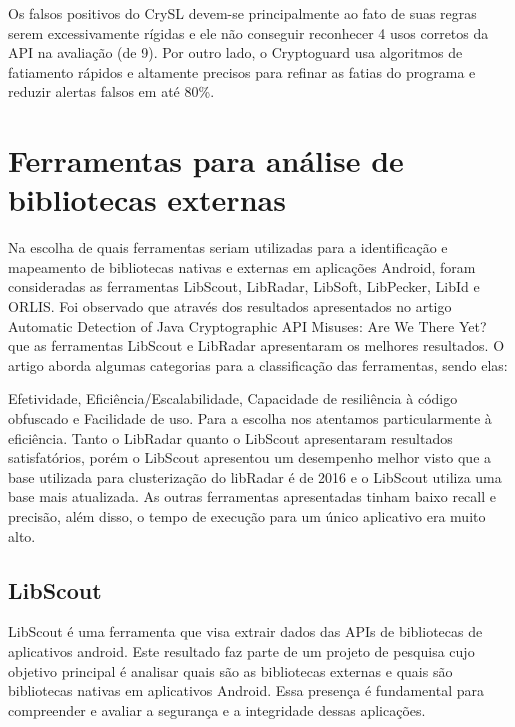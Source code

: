 Os falsos positivos do CrySL devem-se principalmente ao fato de suas regras serem excessivamente rígidas e ele não conseguir reconhecer 4 usos corretos da API na avaliação (de 9). Por outro lado, o Cryptoguard usa algoritmos de fatiamento rápidos e altamente precisos para refinar as fatias do programa e reduzir alertas falsos em até 80\%. 

\section{Ferramentas para análise de bibliotecas externas} %

Na escolha de quais ferramentas seriam utilizadas para a identificação e mapeamento de bibliotecas nativas e externas em aplicações Android, foram consideradas as ferramentas LibScout, LibRadar, LibSoft, LibPecker, LibId e ORLIS. Foi observado que através dos resultados apresentados no artigo Automatic Detection of Java Cryptographic API Misuses: Are We There Yet? que as ferramentas LibScout e LibRadar apresentaram os melhores resultados. O artigo aborda algumas categorias para a classificação das ferramentas, sendo elas:

Efetividade, Eficiência/Escalabilidade, Capacidade de resiliência à código obfuscado e Facilidade de uso. Para a escolha nos atentamos particularmente à eficiência. Tanto o LibRadar quanto o LibScout apresentaram resultados satisfatórios, porém o LibScout apresentou um desempenho melhor visto que a base utilizada para clusterização do libRadar é de 2016 e o LibScout utiliza uma base mais atualizada. As outras ferramentas apresentadas tinham baixo recall e precisão, além disso, o tempo de execução para um único aplicativo era muito alto.

\subsection{LibScout} %

LibScout é uma ferramenta que visa extrair dados das APIs de bibliotecas de aplicativos android. Este resultado faz parte de um projeto de pesquisa cujo objetivo principal é analisar quais são as bibliotecas externas e quais são bibliotecas nativas em aplicativos Android. Essa presença é fundamental para compreender e avaliar a segurança e a integridade dessas aplicações.

